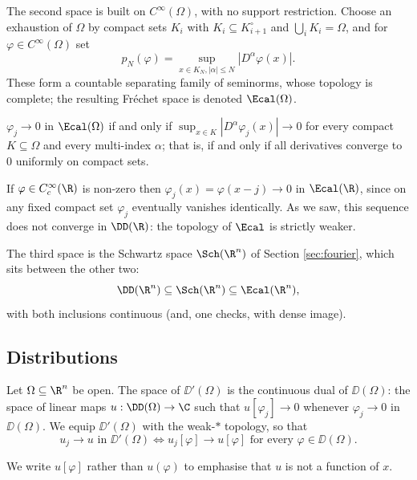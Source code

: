 The second space is built on $C^\infty(\Omega)$, with no support restriction. Choose an exhaustion of $\Omega$ by compact sets $K_i$ with $K_i \subseteq K_{i+1}^\circ$ and $\bigcup_i K_i = \Omega$, and for $\varphi \in C^\infty(\Omega)$ set
$$p_N(\varphi) = \sup_{x \in K_N, |\alpha|\le N}|D^\alpha \varphi(x)|.$$
These form a countable separating family of seminorms, whose topology is complete; the resulting Fr\'echet space is denoted $\Ecal(\Omega)$.

\begin{theorem}\label{thm:Etopology}
	$\varphi_j \to 0$ in $\Ecal(\Omega)$ if and only if $\sup_{x \in K}|D^\alpha \varphi_j(x)|\to 0$ for every compact $K\subseteq\Omega$ and every multi-index $\alpha$; that is, if and only if all derivatives converge to $0$ uniformly on compact sets.
\end{theorem}

\begin{example}
	If $\varphi\in C_c^\infty(\R)$ is non-zero then $\varphi_j(x)=\varphi(x-j)\to 0$ in $\Ecal(\R)$, since on any fixed compact set $\varphi_j$ eventually vanishes identically. As we saw, this sequence does not converge in $\DD(\R)$: the topology of $\Ecal$ is strictly weaker.
\end{example}

The third space is the Schwartz space $\Sch(\R^n)$ of Section \ref{sec:fourier}, which sits between the other two:
$$\DD(\R^n)\subseteq\Sch(\R^n)\subseteq\Ecal(\R^n),$$
with both inclusions continuous (and, one checks, with dense image).

\subsection{Distributions}

\begin{definition}[Distribution]
	Let $\Omega\subseteq\R^n$ be open. The space of  $\DD'(\Omega)$ is the continuous dual of $\DD(\Omega)$: the space of linear maps $u : \DD(\Omega)\to\C$ such that $u[\varphi_j]\to 0$ whenever $\varphi_j \to 0$ in $\DD(\Omega)$. We equip $\DD'(\Omega)$ with the weak-$*$ topology, so that
	$$u_j \to u \text{ in } \DD'(\Omega) \iff u_j[\varphi]\to u[\varphi] \text{ for every } \varphi \in \DD(\Omega).$$
\end{definition}

We write $u[\varphi]$ rather than $u(\varphi)$ to emphasise that $u$ is not a function of $x$.

